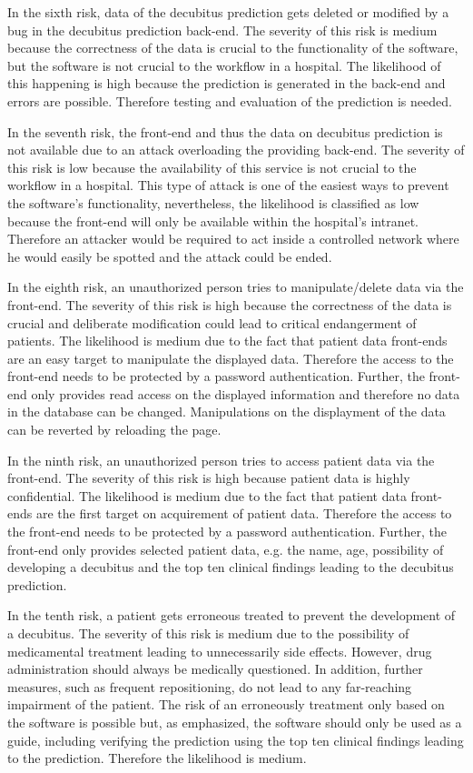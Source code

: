 In the sixth risk, data of the decubitus prediction gets deleted or modified by a bug in the decubitus prediction back-end.
The severity of this risk is medium  because the correctness of the data is crucial to the functionality of the software, but the software is not crucial to the workflow in a hospital.
The likelihood of this happening is high because the prediction is generated in the back-end and errors are possible. 
Therefore testing and evaluation of the prediction is needed.

In the seventh risk, the front-end and thus the data on decubitus prediction is not available due to an attack overloading the providing back-end. 
The severity of this risk is low  because the availability of this service is not crucial to the workflow in a hospital.
This type of attack is one of the easiest ways to prevent the software's functionality, nevertheless, the likelihood is classified as low  because the front-end will only be available within the hospital's intranet. 
Therefore an attacker would be required to act inside a controlled network where he would easily be spotted and the attack could be ended.

In the eighth risk, an unauthorized person tries to manipulate/delete data via the front-end.
The severity of this risk is high  because the correctness of the data is crucial and deliberate modification could lead to critical endangerment of patients.
The likelihood is medium due to the fact that patient data front-ends are an easy target to manipulate the displayed data.
Therefore the access to the front-end needs to be protected by a password authentication.
Further, the front-end only provides read access on the displayed information and therefore no data in the database can be changed. 
Manipulations on the displayment of the data can be reverted by reloading the page.

In the ninth risk, an unauthorized person tries to access patient data via the front-end.
The severity of this risk is high  because patient data is highly confidential.
The likelihood is medium due to the fact that patient data front-ends are the first target on acquirement of patient data.
Therefore the access to the front-end needs to be protected by a password authentication.
Further, the front-end only provides selected patient data, e.g. the name, age, possibility of developing a decubitus and the top ten clinical findings leading to the decubitus prediction.

In the tenth risk, a patient gets erroneous treated to prevent the development of a decubitus.
The severity of this risk is medium due to the possibility of medicamental treatment leading to unnecessarily side effects. However, drug administration should always be medically questioned.
In addition, further measures, such as frequent repositioning, do not lead to any far-reaching impairment of the patient.
The risk of an erroneously treatment only based on the software is possible but, as emphasized, the software should only be used as a guide, including verifying the prediction using the top ten clinical findings leading to the prediction. Therefore the likelihood is medium.

